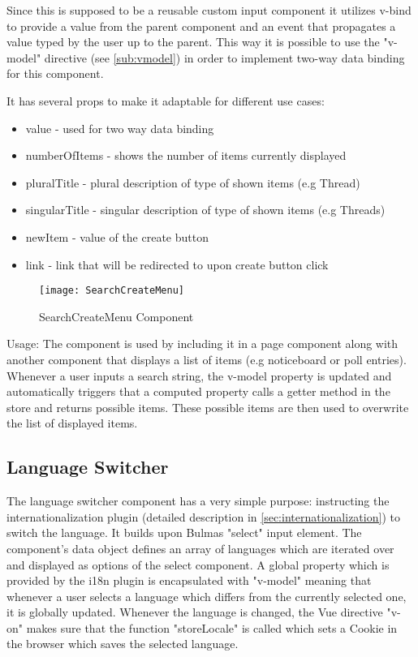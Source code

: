 Since this is supposed to be a reusable custom input component it utilizes v-bind to provide a value from the parent component and an event that propagates a value typed by the user up to the parent. This way it is possible to use the "v-model" directive (see \autoref{sub:vmodel}) in order to implement two-way data binding for this component. 

It has several props to make it adaptable for different use cases:

\begin{itemize}
  \item value - used for two way data binding
  \item numberOfItems - shows the number of items currently displayed
  \item pluralTitle - plural description of type of shown items (e.g Thread)
  \item singularTitle - singular description of type of shown items (e.g Threads)
  \item newItem - value of the create button
  \item link - link that will be redirected to upon create button click
\end{itemize}

\begin{figure}[H]
  \begin{center}
  \texttt{[image: SearchCreateMenu]}
  \end{center}
  \caption{SearchCreateMenu Component}
  \label{fig:searchcreate}
\end{figure}

Usage: The component is used by including it in a page component along with another component that displays a list of items (e.g noticeboard or poll entries). Whenever a user inputs a search string, the v-model property is updated and automatically triggers that a computed property calls a getter method in the store and returns possible items. These possible items are then used to overwrite the list of displayed items.

\subsection{Language Switcher}
The language switcher component has a very simple purpose: instructing the internationalization plugin (detailed description in \autoref{sec:internationalization}) to switch the language. It builds upon Bulmas "select" input element. The component's data object defines an array of languages which are iterated over and displayed as options of the select component. A global property which is provided by the i18n plugin is encapsulated with "v-model" meaning that whenever a user selects a language which differs from the currently selected one, it is globally updated. Whenever the language is changed, the Vue directive "v-on" makes sure that the function "storeLocale" is called which sets a Cookie in the browser which saves the selected language.

